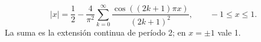 \[|x|=\frac12-\frac4{\pi^2}\sum_{k=0}^{\infty}
\frac{\cos((2k+1)\pi x)}{(2k+1)^2},\qquad -1\le x\le1.\]
La suma es la extensión continua de período 2; en \(x=\pm1\) vale 1.
